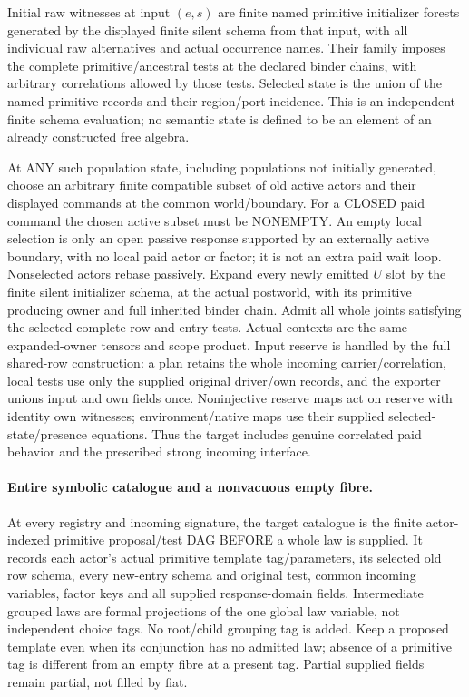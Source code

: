 \documentclass[11pt]{article}
\begin{document}
Initial raw witnesses at input $(e,s)$ are finite named primitive initializer forests generated by the displayed finite silent schema from that input, with all individual raw alternatives and actual occurrence names. Their family imposes the complete primitive/ancestral tests at the declared binder chains, with arbitrary correlations allowed by those tests. Selected state is the union of the named primitive records and their region/port incidence. This is an independent finite schema evaluation; no semantic state is defined to be an element of an already constructed free algebra.

At ANY such population state, including populations not initially generated, choose an arbitrary finite compatible subset of old active actors and their displayed commands at the common world/boundary. For a CLOSED paid command the chosen active subset must be NONEMPTY. An empty local selection is only an open passive response supported by an externally active boundary, with no local paid actor or factor; it is not an extra paid wait loop. Nonselected actors rebase passively. Expand every newly emitted $U$ slot by the finite silent initializer schema, at the actual postworld, with its primitive producing owner and full inherited binder chain. Admit all whole joints satisfying the selected complete row and entry tests. Actual contexts are the same expanded-owner tensors and scope product. Input reserve is handled by the full shared-row construction: a plan retains the whole incoming carrier/correlation, local tests use only the supplied original driver/own records, and the exporter unions input and own fields once. Noninjective reserve maps act on reserve with identity own witnesses; environment/native maps use their supplied selected-state/presence equations. Thus the target includes genuine correlated paid behavior and the prescribed strong incoming interface.


\paragraph{Entire symbolic catalogue and a nonvacuous empty fibre.}
At every registry and incoming signature, the target catalogue is the finite actor-indexed primitive proposal/test DAG BEFORE a whole law is supplied. It records each actor's actual primitive template tag/parameters, its selected old row schema, every new-entry schema and original test, common incoming variables, factor keys and all supplied response-domain fields. Intermediate grouped laws are formal projections of the one global law variable, not independent choice tags. No root/child grouping tag is added. Keep a proposed template even when its conjunction has no admitted law; absence of a primitive tag is different from an empty fibre at a present tag. Partial supplied fields remain partial, not filled by fiat.
\end{document}
